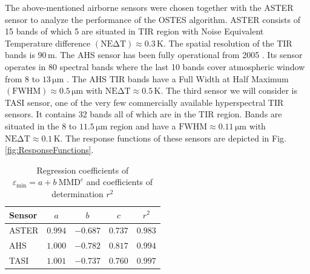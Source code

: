 The above-mentioned airborne sensors were chosen together with the ASTER sensor to analyze the performance of the OSTES algorithm.
ASTER consists of 15 bands of which 5 are situated in TIR region with Noise Equivalent Temperature difference $\mathrm{(NE\Delta T)} \approx 0.3\,\mathrm{K}$. The spatial resolution of the TIR bands is $90\,\mathrm{m}$.
The AHS sensor has been fully operational from 2005 \cite{FM05}. Its sensor operates in 80 spectral bands where the last 10 bands cover atmospheric window from 8 to $13\,\mathrm{\mu m}$ \cite{SJ06}. The AHS TIR bands have a  {Full Width at Half Maximum} $\mathrm{(FWHM)} \approx 0.5\,\mathrm{\mu m}$ with $\mathrm{NE\Delta T} \approx 0.5\,\mathrm{K}$.
 {The third sensor we will consider is TASI sensor,} one of the very few commercially available hyperspectral TIR sensors. It contains 32 bands all of which are in the TIR region. Bands are situated in the 8 to $11.5\,\mathrm{\mu m}$ region and have a $\mathrm{FWHM} \approx 0.11\,\mathrm{\mu m}$ with $\mathrm{NE\Delta T} \approx 0.1\,\mathrm{K}$. The response functions of these sensors are depicted in Fig. \ref{fig:ResponseFunctions}.

\begin{table}[thb]
\vspace{0.5em}
\footnotesize
\centering
\begin{tabular}{lcccc}
\toprule
Sensor & $a$ & $b$ & $c$ & $r^2$\\ \hline
ASTER & $0.994$ & $-0.687$ & $0.737$ & $0.983$ \\
AHS & $1.000$ & $-0.782$ & $0.817$ & $0.994$ \\
TASI & $1.001$ & $-0.737$ & $0.760$ & $0.997$ \\
\bottomrule
\end{tabular}
\vspace{1.5 em}
\caption{Regression coefficients of $\varepsilon_\mathrm{min} = a + b\:\mathrm{MMD}^c$ and coefficients of determination $r^2$}
\label{table:MMDcoef}
\normalsize
\end{table}

